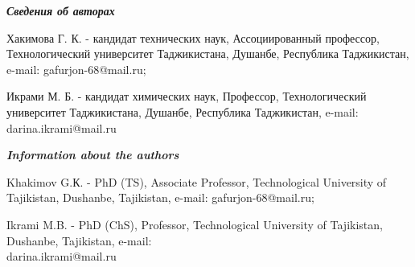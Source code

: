 \begin{authorinfo}
\emph{{\bfseries Сведения об авторах}}

Хакимова Г. К. - кандидат технических наук, Ассоциированный профессор,
Технологический университет Таджикистана, Душанбе, Республика
Таджикистан, e-mail: gafurjon-68@mail.ru;

Икрами М. Б. - кандидат химических наук, Профессор, Технологический
университет Таджикистана, Душанбе, Республика Таджикистан, e-mail:
darina.ikrami@mail.ru

\emph{{\bfseries Information about the authors}}

Khakimov G.К. - PhD (TS), Associate Professor, Technological University
of Tajikistan, Dushanbe, Tajikistan, e-mail: gafurjon-68@mail.ru;

Ikrami M.B. - PhD (ChS), Professor, Technological University of
Tajikistan, Dushanbe, Tajikistan, e-mail: \\darina.ikrami@mail.ru
\end{authorinfo}
